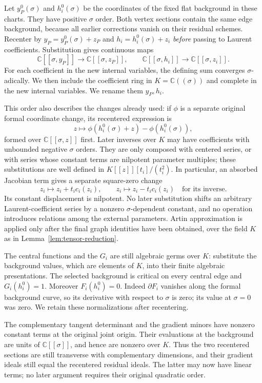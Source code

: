Let $y_P^0(\sigma)$ and $h_i^0(\sigma)$ be the coordinates of the fixed
flat background in these charts.  They have positive $\sigma$ order.
Both vertex sections contain the same edge background, because all
earlier corrections vanish on their residual schemes.  Recenter by
$y_P=y_P^0(\sigma)+z_P$ and $h_i=h_i^0(\sigma)+z_i$ \emph{before}
passing to Laurent coefficients.  Substitution gives continuous maps
\[
 \mathbb C[[\sigma,y_P]]\longrightarrow\mathbb C[[\sigma,z_P]],
 \qquad
 \mathbb C[[\sigma,h_i]]\longrightarrow\mathbb C[[\sigma,z_i]].
\]
For each coefficient in the new internal variables, the defining sum
converges $\sigma$-adically.  We then include the coefficient ring in
$K=\mathbb C((\sigma))$ and complete in the new internal variables.
We rename them $y_P,h_i$.

This order also describes the changes already used: if $\phi$ is a
separate original formal coordinate change, its recentered expression is
\[
 z\longmapsto\phi(h_i^0(\sigma)+z)-\phi(h_i^0(\sigma)),
\]
formed over $\mathbb C[[\sigma,z]]$ first.  Later inverses over $K$ may
have coefficients with unbounded negative $\sigma$ orders.  They are
only composed with centered series, or with series whose constant terms
are nilpotent parameter multiples; these substitutions are well defined
in $K[[z]][t_i]/(t_i^2)$.  In particular, an absorbed Jacobian term gives
a separate square-zero change
\[
 z_i\longmapsto z_i+t_i c_i(z_i),\qquad
 z_i\longmapsto z_i-t_i c_i(z_i)
 \quad\text{for its inverse}.
\]
Its constant displacement is nilpotent.  No later substitution shifts
an arbitrary Laurent-coefficient series by a nonzero
$\sigma$-dependent constant, and no operation introduces relations
among the external parameters.  Artin approximation is applied only
after the final graph identities have been obtained, over the field
$K$ as in Lemma~\ref{lem:tensor-reduction}.

The central functions and the $G_i$ are still algebraic germs over $K$:
substitute the background values, which are elements of $K$, into their
finite algebraic presentations.  The selected background is critical
on every central edge and $G_i(h_i^0)=1$.  Moreover $F_i(h_i^0)=0$.
Indeed $\partial F_i$ vanishes along the formal background curve, so its
derivative with respect to $\sigma$ is zero; its value at $\sigma=0$
was zero.  We retain these normalizations after recentering.

The complementary tangent determinant and the gradient minors have
nonzero constant terms at the original joint origin.  Their evaluations
at the background are units of $\mathbb C[[\sigma]]$, and hence are
nonzero over $K$.  Thus the two recentered sections are still transverse
with complementary dimensions, and their gradient ideals still equal
the recentered residual ideals.  The latter may now have linear terms;
no later argument requires their original quadratic order.

